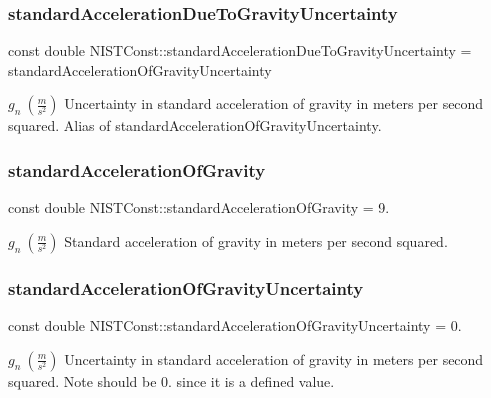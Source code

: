 \subsubsection{\texorpdfstring{standard\+Acceleration\+Due\+To\+Gravity\+Uncertainty}{standardAccelerationDueToGravityUncertainty}}
{\footnotesize\ttfamily const double N\+I\+S\+T\+Const\+::standard\+Acceleration\+Due\+To\+Gravity\+Uncertainty = standard\+Acceleration\+Of\+Gravity\+Uncertainty}

$g_n \ (\frac{m}{s^2})$ Uncertainty in standard acceleration of gravity in meters per second squared. Alias of standard\+Acceleration\+Of\+Gravity\+Uncertainty. \mbox{\label{group___n_i_s_t_const-_gravity_acceleration_gad5bc5f7f030bc2c467a8430e00b42f5e}} 
\subsubsection{\texorpdfstring{standard\+Acceleration\+Of\+Gravity}{standardAccelerationOfGravity}}
{\footnotesize\ttfamily const double N\+I\+S\+T\+Const\+::standard\+Acceleration\+Of\+Gravity = 9.}

$g_n \ (\frac{m}{s^2})$ Standard acceleration of gravity in meters per second squared. \mbox{\label{group___n_i_s_t_const-_gravity_acceleration_gaabc6df92c25677a5b767445f101d4f57}} 
\subsubsection{\texorpdfstring{standard\+Acceleration\+Of\+Gravity\+Uncertainty}{standardAccelerationOfGravityUncertainty}}
{\footnotesize\ttfamily const double N\+I\+S\+T\+Const\+::standard\+Acceleration\+Of\+Gravity\+Uncertainty = 0.}

$g_n \ (\frac{m}{s^2})$ Uncertainty in standard acceleration of gravity in meters per second squared. Note should be 0. since it is a defined value. 